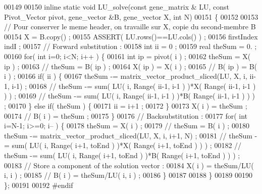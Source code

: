 \begin{DoxyCode}
00149 
00150   \textcolor{keyword}{inline} \textcolor{keyword}{static} \textcolor{keywordtype}{void} LU\_solve(\textcolor{keyword}{const} gene\_matrix & LU, \textcolor{keyword}{const} Pivot\_Vector pivot, gene\_vector &B, gene\_vector
       X, \textcolor{keywordtype}{int} N)
00151   \{
00152 
00153     \textcolor{comment}{// Pour conserver le meme header, on travaille sur X, copie du second-membre B}
00154     X = B.copy() ;
00155     ASSERT( LU.rows()==LU.cols() ) ;
00156     firstIndex indI ;
00157     \textcolor{comment}{// Forward substitution :}
00158     \textcolor{keywordtype}{int} ii = 0 ;
00159     real theSum = 0. ;
00160     \textcolor{keywordflow}{for}( \textcolor{keywordtype}{int} i=0; i<N; i++ ) \{
00161       \textcolor{keywordtype}{int} ip = pivot( i ) ;
00162       theSum = X( ip ) ;
00163       \textcolor{comment}{//      theSum = B( ip ) ;}
00164       X( ip ) = X( i ) ;
00165       \textcolor{comment}{//      B( ip ) = B( i ) ;}
00166       \textcolor{keywordflow}{if}( ii ) \{
00167     theSum -= matrix\_vector\_product\_sliced(LU, X, i, ii-1, i-1) ;
00168     \textcolor{comment}{//  theSum -= sum( LU( i, Range( ii-1, i-1 ) )*X( Range( ii-1, i-1 ) ) ) ;}
00169     \textcolor{comment}{//  theSum -= sum( LU( i, Range( ii-1, i-1 ) )*B( Range( ii-1, i-1 ) ) ) ;}
00170       \} \textcolor{keywordflow}{else} \textcolor{keywordflow}{if}( theSum ) \{
00171     ii = i+1 ;
00172       \}
00173       X( i ) = theSum ;
00174       \textcolor{comment}{//      B( i ) = theSum ;}
00175     \}
00176     \textcolor{comment}{// Backsubstitution :}
00177     \textcolor{keywordflow}{for}( \textcolor{keywordtype}{int} i=N-1; i>=0; i-- ) \{
00178       theSum = X( i ) ;
00179       \textcolor{comment}{//      theSum = B( i ) ;}
00180       theSum -= matrix\_vector\_product\_sliced(LU, X, i, i+1, N) ;
00181       \textcolor{comment}{//      theSum -= sum( LU( i, Range( i+1, toEnd ) )*X( Range( i+1, toEnd ) ) ) ;}
00182       \textcolor{comment}{//      theSum -= sum( LU( i, Range( i+1, toEnd ) )*B( Range( i+1, toEnd ) ) ) ;}
00183       \textcolor{comment}{// Store a component of the solution vector :}
00184       X( i ) = theSum/LU( i, i ) ;
00185       \textcolor{comment}{//      B( i ) = theSum/LU( i, i ) ;}
00186     \}
00187 
00188   \}
00189 
00190 \};
00191 
00192 \textcolor{preprocessor}{#endif}
\end{DoxyCode}
